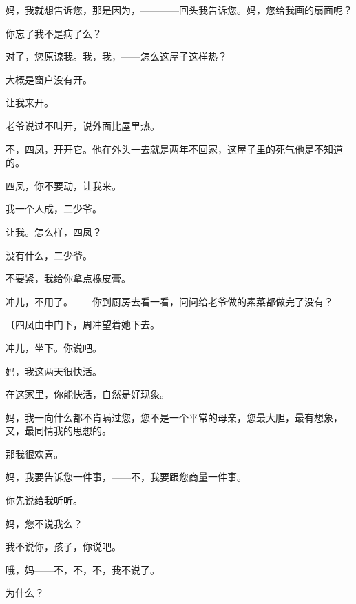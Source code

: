 妈，我就想告诉您，那是因为，————回头我告诉您。妈，您给我画的扇面呢？

你忘了我不是病了么？

对了，您原谅我。我，我，——怎么这屋子这样热？

大概是窗户没有开。

让我来开。

老爷说过不叫开，说外面比屋里热。

不，四凤，开开它。他在外头一去就是两年不回家，这屋子里的死气他是不知道的。

四凤，你不要动，让我来。

我一个人成，二少爷。

让我。怎么样，四凤？

没有什么，二少爷。

不要紧，我给你拿点橡皮膏。

冲儿，不用了。——你到厨房去看一看，问问给老爷做的素菜都做完了没有？

{\fangsong〔四凤由中门下，周冲望着她下去。}

冲儿，坐下。你说吧。

妈，我这两天很快活。

在这家里，你能快活，自然是好现象。

妈，我一向什么都不肯瞒过您，您不是一个平常的母亲，您最大胆，最有想象，又，最同情我的思想的。

那我很欢喜。

妈，我要告诉您一件事，——不，我要跟您商量一件事。

你先说给我听听。

妈，您不说我么？

我不说你，孩子，你说吧。

哦，妈——不，不，不，我不说了。

为什么？

